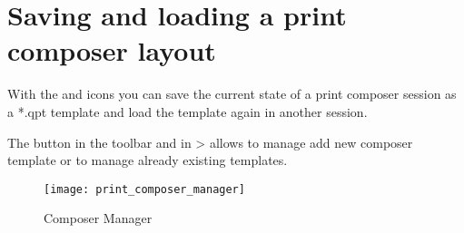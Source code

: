 \section{Saving and loading a print composer layout}

With the  and
 icons you can save the current
state of a print composer session as a  *.qpt template and load the template
again in another session.

The   button in the
toolbar and in  >
 allows to manage
add new composer template or to manage already existing templates. 

\begin{figure}[h]
   \centering
   \texttt{[image: print\_composer\_manager]}   
   \caption{Composer Manager \nixcaption}
   \label{fig:print_composer_manager}
\end{figure}
   
\FloatBarrier

